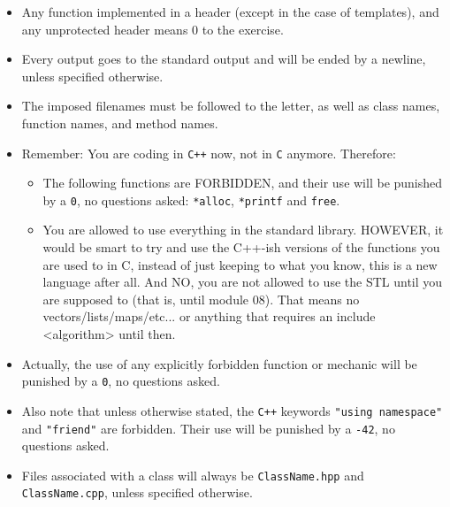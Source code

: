     \begin{itemize}

		\item Any function implemented in a header (except in the case of
		templates), and any unprotected header means 0 to the exercise.

		\item Every output goes to the standard output and will be
          ended by a newline, unless specified otherwise.

		\item The imposed filenames must be followed to the letter, as
          well as class names, function names, and method names.

		\item Remember: You are coding in \texttt{C++} now, not in
          \texttt{C} anymore. Therefore:
		  
		  \begin{itemize}
		  
		  \item	The following functions are FORBIDDEN, and their use will be
		  punished by a \texttt{0}, no questions asked: \texttt{*alloc},
		  \texttt{*printf} and \texttt{free}.

		  \item You are allowed to use everything in the standard
		  library. HOWEVER, it would be smart to try and use the C++-ish
		  versions of the functions you are used to in C, instead of just
		  keeping to what you know, this is a new language after all. And NO,
		  you are not allowed to use the STL until you are supposed to
		  (that is, until module 08). That means no vectors/lists/maps/etc... or
		  anything that requires an include <algorithm> until then.

		  \end{itemize}

		\item Actually, the use of any explicitly forbidden function or
		mechanic will be punished by a \texttt{0}, no questions asked.

        \item Also note that unless otherwise stated, the \texttt{C++}
          keywords \texttt{"using namespace"} and \texttt{"friend"} are
          forbidden. Their use will be punished by a \texttt{-42}, no
          questions asked.

        \item Files associated with a class will always be
          \texttt{ClassName.hpp} and \texttt{ClassName.cpp}, unless
          specified otherwise.


\end{itemize}
